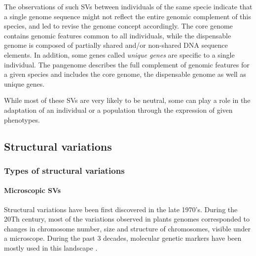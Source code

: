 \documentclass[a4paper, 12pt]{article}
\begin{document}
\begin{onehalfspace}
The observations of such SVs between individuals of the same specie indicate that a single genome sequence might not reflect the entire genomic complement of this species, and led to revise the genome concept accordingly. The core genome contains genomic features common to all individuals, while the dispensable genome is composed of partially shared and/or non-shared DNA sequence elements. In addition, some genes called \textit{unique genes} are specific to a single individual. The pangenome describes the full complement of genomic features for a given species and includes the core genome, the dispensable genome as well as unique genes.

While most of these SVs are very likely to be neutral, some can play a role in the adaptation of an individual or a population through the expression of given phenotypes.

        \subsection{Structural variations}
        
            \subsubsection{Types of structural variations}

                \paragraph{Microscopic SVs}
                
Structural variations have been first discovered in the late 1970's. During the 20Th century, most of the variations observed in plants genomes corresponded to changes in chromosome number, size and structure of chromosomes, visible under a microscope. During the past 3 decades, molecular genetic markers have been mostly used in this landscape \citep{Varshney2012}.


\end{onehalfspace}
\end{document}

